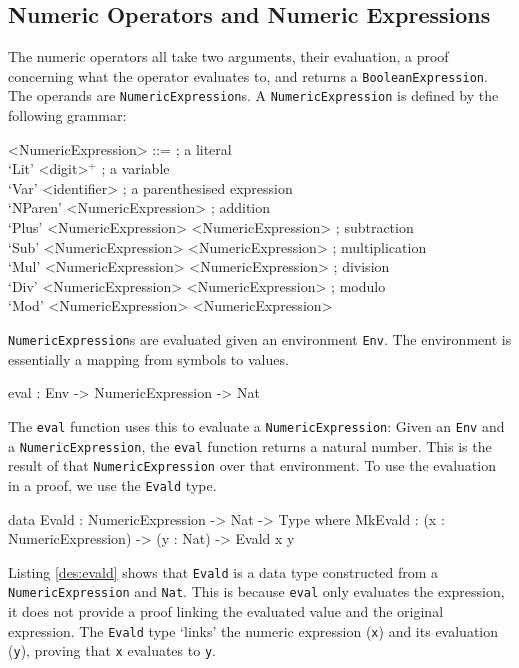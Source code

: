     \subsection{Numeric Operators and Numeric Expressions}
        The numeric operators all take two arguments, their evaluation, a proof concerning what the operator evaluates to, and returns a \texttt{BooleanExpression}.
        The operands are \texttt{NumericExpression}s. A \texttt{NumericExpression} is defined by the following grammar:
        \setlength{\grammarindent}{12em}
        \begin{grammar}
            <NumericExpression>
            ::=  ; a literal\\
                 `Lit' <digit>$^+$
            \alt ; a variable\\
                 `Var' <identifier>
            \alt ; a parenthesised expression\\
                 `NParen' <NumericExpression>
            \alt ; addition\\
                 `Plus' <NumericExpression> <NumericExpression>
            \alt ; subtraction\\
                 `Sub' <NumericExpression> <NumericExpression>
            \alt ; multiplication\\
                 `Mul' <NumericExpression> <NumericExpression>
            \alt ; division\\
                 `Div' <NumericExpression> <NumericExpression>
            \alt ; modulo\\
                 `Mod' <NumericExpression> <NumericExpression>
        \end{grammar}
        \texttt{NumericExpression}s are evaluated given an environment \texttt{Env}. The environment is essentially a mapping from symbols to values.
        \begin{code}[caption={The type of the \texttt{eval} function}]
            eval : Env -> NumericExpression -> Nat
        \end{code}
        The \texttt{eval} function uses this to evaluate a \texttt{NumericExpression}: Given an \texttt{Env} and a \texttt{NumericExpression}, the \texttt{eval} function returns a natural number. This is the result of that \texttt{NumericExpression} over that environment. To use the evaluation in a proof, we use the \texttt{Evald} type.
        \begin{code}[caption={\texttt{Evald} as defined in the \Idris model},label={des:evald}]
    data Evald : NumericExpression -> Nat -> Type where
        MkEvald : (x : NumericExpression) -> (y : Nat) -> Evald x y
        \end{code}
        Listing \ref{des:evald} shows that \texttt{Evald} is a data type constructed from a \texttt{NumericExpression} and \texttt{Nat}. This  is because \texttt{eval} only evaluates the expression, it does not provide a proof linking the evaluated value and the original expression. The \texttt{Evald} type `links' the numeric expression (\texttt{x}) and its evaluation (\texttt{y}), proving that \texttt{x} evaluates to \texttt{y}.
        \\
        
